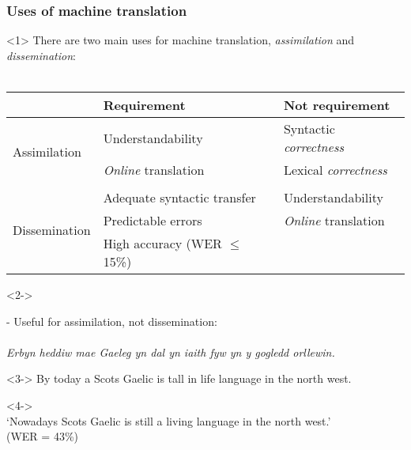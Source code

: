 \documentclass{beamer}
\begin{document}
\begin{frame}
\frametitle{Uses of machine translation}

\begin{onlyenv}<1>
There are two main uses for machine translation, \emph{assimilation} and \emph{dissemination}:\\
~\\
\begin{table}
\begin{tabular}{l|l|l}
~  & Requirement & Not requirement\\
\hline
\multirow{3}{*}{Assimilation} & Understandability         & Syntactic \emph{correctness}\\
                              & \emph{Online} translation & Lexical \emph{correctness}\\
                              &                  & \\
\hline
\multirow{3}{*}{Dissemination} & Adequate syntactic transfer & Understandability \\
                               &  Predictable errors   & \emph{Online} translation \\
                               &  High accuracy (WER $\le$ 15\%)    & \\
\hline
\end{tabular}
\end{table}

\end{onlyenv}

\begin{onlyenv}<2->

- Useful for assimilation, not dissemination:\\
~\\
\emph{Erbyn heddiw mae Gaeleg yn dal yn iaith fyw yn y gogledd orllewin. }\\
\end{onlyenv}

\begin{onlyenv}<3->
By today a Scots Gaelic is tall in life language in the north west.\\
\end{onlyenv}

\begin{onlyenv}<4->
~\\
`Nowadays Scots Gaelic is still a living language in the north west.'\\ (WER = 43\%)\\
~\\
\end{onlyenv}


\end{frame}
\end{document}
